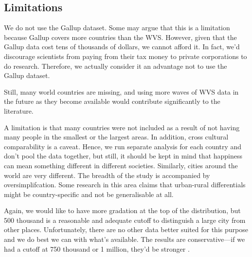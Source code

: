 \documentclass[10pt, letterpaper]{article}
\begin{document}
\begin{spacing}{1.4} %



\subsection*{Limitations}

We do not use the Gallup dataset. Some may argue that this is a limitation because Gallup covers more countries than the WVS. However, given that the Gallup data cost tens of thousands of dollars, we cannot afford it. In fact, we'd discourage scientists from paying from their tax money to private corporations to do research. Therefore, we actually consider it an advantage not to use the Gallup dataset.

Still, many world countries are missing, and using more waves of WVS data in the future as they
become available would contribute significantly to the literature. 

A limitation is that many countries were not included as a result of not having
many people in the smallest or the largest areas. In addition, cross cultural
comparability is a caveat. Hence, we run separate analysis for each country and
don't pool the data together, but still, it should be kept in mind that
happiness can mean something different in different societies. Similarly, cities
around the world are very different. The breadth of the study is accompanied by
oversimplifcation. Some research in this area claims that urban-rural differentials might be country-specific and not be generalisable at all. %

Again, we would like to have more gradation at the top of the distribution, but
500 thousand is a reasonable and adequate cutoff to distinguish a large city
from other places. Unfortunately, there are no other data better suited for this
purpose and we do best we can with what's available. The results are
conservative---if we had a cutoff at 750 thousand or 1 million, they'd be
stronger \citep{aokCityBook15}.


\end{spacing}
\end{document}
